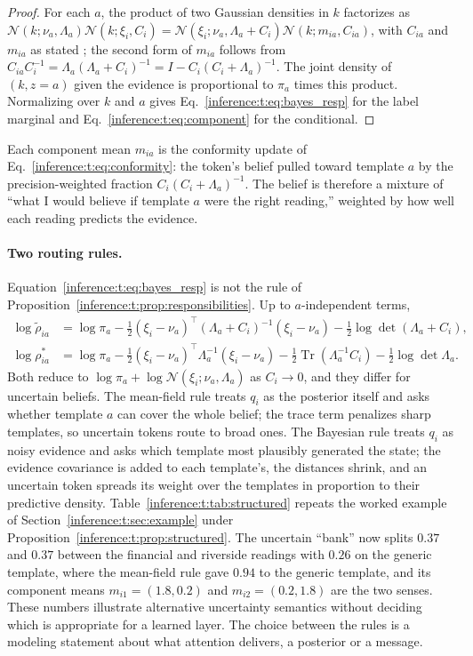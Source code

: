 \documentclass[11pt]{article}
\theoremstyle{definition}
\theoremstyle{remark}
\providecommand{\Tr}{\operatorname{Tr}}
\providecommand{\N}{\mathcal{N}}
\begin{document}
\begin{proof}
For each $a$, the product of two Gaussian densities in $k$ factorizes as $\N(k;\nu_a,\Lambda_a)\N(k;\xi_i,C_i)=\N(\xi_i;\nu_a,\Lambda_a+C_i)\N(k;m_{ia},C_{ia})$, with $C_{ia}$ and $m_{ia}$ as stated \citep{inference:bishop2006}; the second form of $m_{ia}$ follows from $C_{ia}C_i^{-1}=\Lambda_a(\Lambda_a+C_i)^{-1}=I-C_i(C_i+\Lambda_a)^{-1}$. The joint density of $(k,z=a)$ given the evidence is proportional to $\pi_a$ times this product. Normalizing over $k$ and $a$ gives Eq.~\eqref{inference:t:eq:bayes_resp} for the label marginal and Eq.~\eqref{inference:t:eq:component} for the conditional.
\end{proof}

Each component mean $m_{ia}$ is the conformity update of Eq.~\eqref{inference:t:eq:conformity}: the token's belief pulled toward template $a$ by the precision-weighted fraction $C_i(C_i+\Lambda_a)^{-1}$. The belief is therefore a mixture of ``what I would believe if template $a$ were the right reading,'' weighted by how well each reading predicts the evidence.

\paragraph{Two routing rules.}
Equation~\eqref{inference:t:eq:bayes_resp} is not the rule of Proposition~\ref{inference:t:prop:responsibilities}. Up to $a$-independent terms,
\begin{align*}
\log\tilde\rho_{ia}&=\log\pi_a-\tfrac12(\xi_i-\nu_a)^{\top}(\Lambda_a+C_i)^{-1}(\xi_i-\nu_a)-\tfrac12\log\det(\Lambda_a+C_i),\\
\log\rho^{*}_{ia}&=\log\pi_a-\tfrac12(\xi_i-\nu_a)^{\top}\Lambda_a^{-1}(\xi_i-\nu_a)-\tfrac12\Tr(\Lambda_a^{-1}C_i)-\tfrac12\log\det\Lambda_a.
\end{align*}
Both reduce to $\log\pi_a+\log\N(\xi_i;\nu_a,\Lambda_a)$ as $C_i\to0$, and they differ for uncertain beliefs. The mean-field rule treats $q_i$ as the posterior itself and asks whether template $a$ can cover the whole belief; the trace term penalizes sharp templates, so uncertain tokens route to broad ones. The Bayesian rule treats $q_i$ as noisy evidence and asks which template most plausibly generated the state; the evidence covariance is added to each template's, the distances shrink, and an uncertain token spreads its weight over the templates in proportion to their predictive density. Table~\ref{inference:t:tab:structured} repeats the worked example of Section~\ref{inference:t:sec:example} under Proposition~\ref{inference:t:prop:structured}. The uncertain ``bank'' now splits $0.37$ and $0.37$ between the financial and riverside readings with $0.26$ on the generic template, where the mean-field rule gave $0.94$ to the generic template, and its component means $m_{i1}=(1.8,0.2)$ and $m_{i2}=(0.2,1.8)$ are the two senses. These numbers illustrate alternative uncertainty semantics without deciding which is appropriate for a learned layer. The choice between the rules is a modeling statement about what attention delivers, a posterior or a message.
\end{document}

